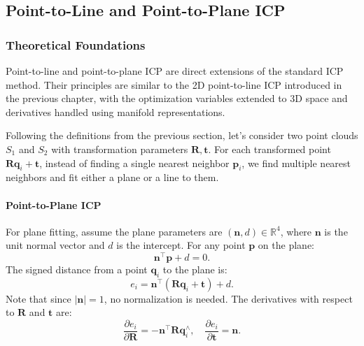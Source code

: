 \subsection{Point-to-Line and Point-to-Plane ICP}
\subsubsection{Theoretical Foundations}
Point-to-line and point-to-plane ICP are direct extensions of the standard ICP method. Their principles are similar to the 2D point-to-line ICP introduced in the previous chapter, with the optimization variables extended to 3D space and derivatives handled using manifold representations. 

Following the definitions from the previous section, let's consider two point clouds $S_1$ and $S_2$ with transformation parameters $\mathbf{R}, \mathbf{t}$. For each transformed point $\mathbf{R} \mathbf{q}_i + \mathbf{t}$, instead of finding a single nearest neighbor $\mathbf{p}_i$, we find multiple nearest neighbors and fit either a plane or a line to them.

\paragraph{Point-to-Plane ICP}  
For plane fitting, assume the plane parameters are $(\mathbf{n},d) \in \mathbb{R}^4$, where $\mathbf{n}$ is the unit normal vector and $d$ is the intercept. For any point $\mathbf{p}$ on the plane:
\begin{equation}\label{key}
	\mathbf{n}^\top \mathbf{p} + d = 0.
\end{equation}
The signed distance from a point $\mathbf{q}_i$ to the plane is:
\begin{equation}\label{key}
	e_i = \mathbf{n}^\top (\mathbf{R} \mathbf{q}_i + \mathbf{t}) + d.
\end{equation}
Note that since $|\mathbf{n}|=1$, no normalization is needed. The derivatives with respect to $\mathbf{R}$ and $\mathbf{t}$ are:
\begin{equation}\label{key}
	\frac{\partial e_i}{\partial \mathbf{R}} = -\mathbf{n}^\top \mathbf{R} \mathbf{q}_i^\wedge, \quad \frac{\partial e_i}{\partial \mathbf{t}} = \mathbf{n}.
\end{equation}

